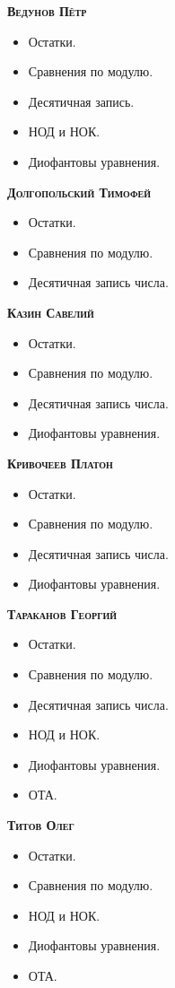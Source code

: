 \documentclass[11pt]{article}
\begin{document}
    \textbf{\textsc{Ведунов Пётр}}
    \begin{itemize}
        \item Остатки.
        \item Сравнения по модулю.
        \item Десятичная запись.
        \item НОД и НОК.
        \item Диофантовы уравнения.
    \end{itemize}
    \textbf{\textsc{Долгопольский Тимофей}}
    \begin{itemize}
        \item Остатки.
        \item Сравнения по модулю.
        \item Десятичная запись числа.
    \end{itemize}
    \textbf{\textsc{Казин Савелий}}
    \begin{itemize}
        \item Остатки.
        \item Сравнения по модулю.
        \item Десятичная запись числа.
        \item Диофантовы уравнения.
    \end{itemize}
    \textbf{\textsc{Кривочеев Платон}}
    \begin{itemize}
        \item Остатки.
        \item Сравнения по модулю.
        \item Десятичная запись числа.
        \item Диофантовы уравнения.
    \end{itemize}
    \textbf{\textsc{Тараканов Георгий}}
    \begin{itemize}
        \item Остатки.
        \item Сравнения по модулю.
        \item Десятичная запись числа.
        \item НОД и НОК.
        \item Диофантовы уравнения.
        \item ОТА.
    \end{itemize}
    \textbf{\textsc{Титов Олег}}
    \begin{itemize}
        \item Остатки.
        \item Сравнения по модулю.
        \item НОД и НОК.
        \item Диофантовы уравнения.
        \item ОТА.
    \end{itemize}
\end{document}
